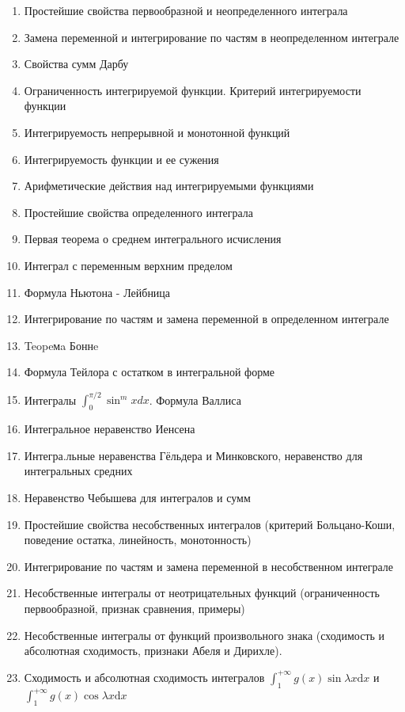 \documentclass[12pt, a4paper]{article}
\begin{document}
\begin{enumerate}
    \item Простейшие свойства первообразной и неопределенного интеграла
    \item Замена переменной и интегрирование по частям в неопределенном интеграле
    \item Свойства сумм Дарбу
    \item Ограниченность интегрируемой функции. Критерий интегрируемости функции
    \item Интегрируемость непрерывной и монотонной функций
    \item Интегрируемость функции и ее сужения
    \item Арифметические действия над интегрируемыми функциями
    \item Простейшие свойства определенного интеграла
    \item Первая теорема о среднем интегрального исчисления
    \item Интеграл с переменным верхним пределом
    \item Формула Ньютона - Лейбница
    \item Интегрирование по частям и замена переменной в определенном интеграле
    \item Teopeмa Боннe
    \item Формула Тейлора с остатком в интегральной форме
    \item Интегралы $\int_{0}^{\pi / 2} \sin ^{m} x d x$. Формула Валлиса
    \item Интегральное неравенство Иенсена
    \item Интегра.льные неравенства Гёльдера и Минковского, неравенство для интегральных средних
    \item Неравенство Чебышева для интегралов и сумм
    \item Простейшие свойства несобственных интегралов (критерий Больцано-Коши, поведение остатка, линейность, монотонность)
    \item Интегрирование по частям и замена переменной в несобственном интеграле
    \item Несобственные интегралы от неотрицательных функций (ограниченность первообразной, признак сравнения, примеры)
    \item Несобственные интегралы от функций произвольного знака (сходимость и абсолютная сходимость, признаки Абеля и Дирихле).
    \item Сходимость и абсолютная сходимость интегралов $\int_{1}^{+\infty} g(x) \sin \lambda x \mathrm{d} x$ 
    и $\int_{1}^{+\infty} g(x) \cos \lambda x \mathrm{d} x$
    

\end{enumerate}
\end{document}
